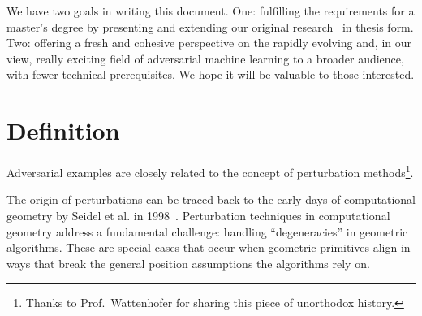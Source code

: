 \documentclass[a4paper, oneside]{discothesis}
\begin{document}
We have two goals in writing this document. One: fulfilling the requirements for a master's degree by presenting and extending our original research~\cite{jabary2024seeing} in thesis form. Two: offering a fresh and cohesive perspective on the rapidly evolving and, in our view, really exciting field of adversarial machine learning to a broader audience, with fewer technical prerequisites. We hope it will be valuable to those interested.

\section{Definition}

Adversarial examples are closely related to the concept of perturbation methods\footnote{Thanks to Prof.\ Wattenhofer for sharing this piece of unorthodox history.}.

The origin of perturbations can be traced back to the early days of computational geometry by Seidel et al. in 1998~\cite{seidel1998nature}. Perturbation techniques in computational geometry address a fundamental challenge: handling ``degeneracies'' in geometric algorithms. These are special cases that occur when geometric primitives align in ways that break the general position assumptions the algorithms rely on.
\end{document}
